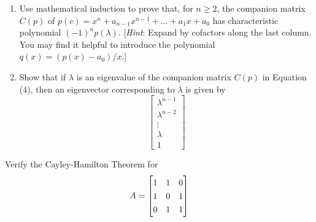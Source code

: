 \documentclass[12pt,letterpaper]{hmcpset}
\newcommand{\m}[1]{\renewcommand*{\arraystretch}{1.3} \begin{bmatrix} #1 \end{bmatrix}}
\begin{document}
\begin{solution}
\vfill
\end{solution}
\newpage

\begin{problem}[4.3.32]
	\begin{enumerate}
		\item
			Use mathematical induction to prove that, for $n \geq 2$, the companion matrix $C(p)$ of $p(c) = x^n + a_{n-1}x^{n-1} + \dots + a_1x + a_0$ has characteristic polynomial $(-1)^np(\lambda)$. [\emph{Hint}: Expand by cofactors along the last column. You may find it helpful to introduce the polynomial $q(x) = (p(x) -a_0)/x$.]
		
		\item
			Show that if $\lambda$ is an eigenvalue of the companion matrix $C(p)$ in Equation (4), then an eigenvector corresponding to $\lambda$ is given by
			$$\m{\lambda^{n-1}\\\lambda^{n-2}\\ \vdots \\ \lambda \\ 1}$$
	\end{enumerate}

\end{problem}

\begin{solution}
\vfill
\end{solution}
\newpage

\begin{problem}[4.3.34]
Verify the Cayley-Hamilton Theorem for
$$ A = \m{1 & 1 & 0 \\ 1 & 0 & 1 \\ 0 & 1 & 1}$$
\end{problem}

\begin{solution}
\vfill
\end{solution}
\end{document}
